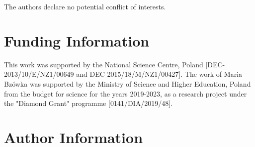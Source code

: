 \documentclass[9pt,tutorial, pubversion]{livecoms}
\begin{document}
The authors declare no potential conflict of interests.

\section{Funding Information}
This work was supported by the National Science Centre, Poland [DEC-2013/10/E/NZ1/00649 and \newline DEC-2015/18/M/NZ1/00427]. \newline
The work of Maria Bzówka was supported by the Ministry of Science and Higher Education, Poland from the budget for science for the years 2019-2023, as a research project under the "Diamond Grant" programme [0141/DIA/2019/48].

\section*{Author Information}
\makeorcid




\end{document}
